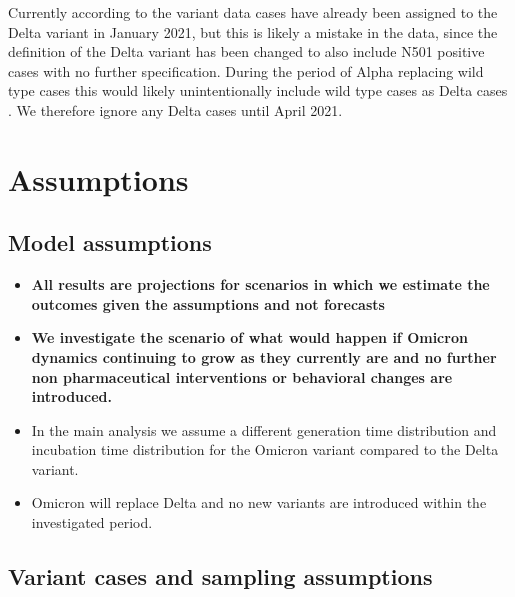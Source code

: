 \documentclass[
]{article}
\providecommand{\tightlist}{%
  \setlength{\itemsep}{0pt}\setlength{\parskip}{0pt}}
\begin{document}
Currently according to the variant data cases have already been assigned to the Delta variant in January 2021, but this is likely a
mistake in the data, since the definition of the Delta variant has been changed to also include
N501 positive cases with no further specification. During the period of Alpha replacing
wild type cases this would likely unintentionally include wild type cases as Delta cases \autocite{SARSCov2VariantenOesterreich}.
We therefore ignore any Delta cases until April 2021.

\hypertarget{assumptions}{%
\section{Assumptions}\label{assumptions}}

\hypertarget{model-assumptions}{%
\subsection{Model assumptions}\label{model-assumptions}}

\begin{itemize}
\tightlist
\item
  \textbf{All results are projections for scenarios in which we estimate the outcomes given the assumptions and not forecasts}
\item
  \textbf{We investigate the scenario of what would happen if Omicron dynamics continuing to grow as they currently are and no further non pharmaceutical interventions or behavioral changes are introduced. }
\item
  In the main analysis we assume a different generation time distribution and incubation time distribution for the Omicron variant compared to the Delta variant.
\item
  Omicron will replace Delta and no new variants are introduced within the investigated period.
\end{itemize}

\hypertarget{variant-cases-and-sampling-assumptions}{%
\subsection{Variant cases and sampling assumptions}\label{variant-cases-and-sampling-assumptions}}
\end{document}
